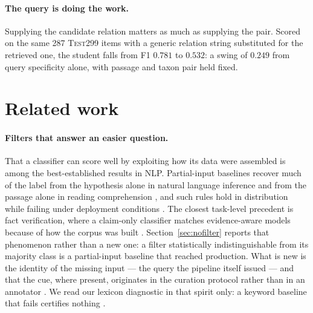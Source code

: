 \documentclass[11pt]{article}
\begin{document}
\paragraph{The query is doing the work.} Supplying the candidate relation matters as much as
supplying the pair. Scored on the same 287 \textsc{Test299} items with a generic relation string
substituted for the retrieved one, the student falls from F1 $0.781$ to $0.532$: a swing of
$0.249$ from query specificity alone, with passage and taxon pair held fixed.

\section{Related work}
\label{sec:related}

\paragraph{Filters that answer an easier question.}
That a classifier can score well by exploiting how its data were assembled is among the
best-established results in NLP. Partial-input baselines recover much of the label from the
hypothesis alone in natural language inference \citep{gururangan-etal-2018-annotation,poliak-etal-2018-hypothesis} and from the passage alone in reading comprehension
\citep{kaushik-lipton-2018-much}, and such rules hold in distribution while failing under
deployment conditions \citep{geirhos-etal-2020-shortcut,du-etal-2024-shortcut}. The
closest task-level precedent is fact verification, where a claim-only classifier matches
evidence-aware models because of how the corpus was built \citep{schuster-etal-2019-towards}.
Section~\ref{sec:nofilter} reports that phenomenon rather than a new one: a filter
statistically indistinguishable from its majority class is a partial-input baseline that
reached production. What is new is the identity of the missing input --- the query the pipeline
itself issued --- and that the cue, where present, originates in the curation protocol rather
than in an annotator \citep{wiegand-etal-2019-detection,parmar-etal-2023-dont}. We read our lexicon
diagnostic in that spirit only: a keyword baseline that fails certifies nothing
\citep{feng-etal-2019-misleading}.
\end{document}
